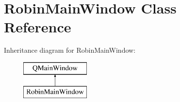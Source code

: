 \hypertarget{class_robin_main_window}{}\section{Robin\+Main\+Window Class Reference}
\label{class_robin_main_window}
Inheritance diagram for Robin\+Main\+Window\+:\begin{figure}[H]
\begin{center}
\leavevmode
\includegraphics[height=2.000000cm]{class_robin_main_window}
\end{center}
\end{figure}

